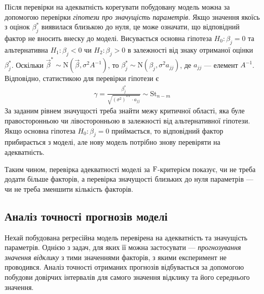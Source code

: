 Після перевірки на адекватність корегувати побудовану модель можна за допомогою перевірки \emph{гіпотези
про значущість параметрів}. Якщо значення якоїсь з оцінок $\beta_j^*$ виявилася близькою до нуля,
це може означати, що відповідний фактор не вносить внеску до моделі.
Висувається основна гіпотеза $H_0 : \beta_j = 0$ та альтернативна $H_1 : \beta_j < 0$ чи
$H_2 : \beta_j > 0$ в залежності від знаку отриманої оцінки $\beta_j^*$.
Оскільки $\vec{\beta}^* \sim \mathrm{N}(\vec{\beta}, \sigma^2 A^{-1})$,
то $\beta_j^* \sim \mathrm{N}(\beta_j, \sigma^2 a_{jj})$, де $a_{jj}$ --- елемент $A^{-1}$. Відповідно,
статистикою для перевірки гіпотези є 
\begin{gather}\label{signif_test}
    \gamma = 
    \frac{\beta_j^* }{\sqrt{(\sigma^2)^{**} \cdot a_{jj}}} \sim \mathrm{St}_{n-m}
\end{gather}
За заданим рівнем значущості треба знайти межу критичної області, яка буле правосторонньою чи лівосторонньою в залежності
від альтернативної гіпотези. Якщо основна гіпотеза $H_0 : \beta_j = 0$ приймається, то
відповідний фактор прибирається з моделі, але нову модель потрібно знову перевіряти на адекватність.

Таким чином, перевірка адекватності моделі за $\rm F$-критерієм показує,
чи не треба додати більше факторів, а перевірка значущості близьких до нуля параметрів ---
чи не треба зменшити кількість факторів.

\subsection{Аналіз точності прогнозів моделі}
Нехай побудована регресійна модель перевірена на адекватність та значущість параметрів.
Однією з задач, для яких її можна застосувати --- \emph{прогнозування значення відклику}
з тими значеннями факторів, з якими експеримент не проводився.
Аналіз точності отриманих прогнозів відбувається за допомогою побудови
довірчих інтервалів для самого значення відклику та його середнього значення.


